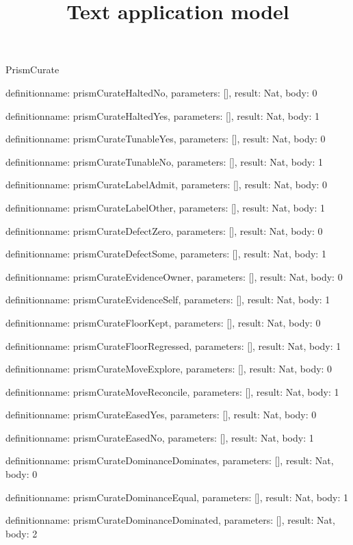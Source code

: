 \begin{lexlean}{PrismCurate}
\title{Text application model}
\begin{semanticmodule}
definition{name: prismCurateHaltedNo, parameters: [], result: Nat, body: 0}

definition{name: prismCurateHaltedYes, parameters: [], result: Nat, body: 1}

definition{name: prismCurateTunableYes, parameters: [], result: Nat, body: 0}

definition{name: prismCurateTunableNo, parameters: [], result: Nat, body: 1}

definition{name: prismCurateLabelAdmit, parameters: [], result: Nat, body: 0}

definition{name: prismCurateLabelOther, parameters: [], result: Nat, body: 1}

definition{name: prismCurateDefectZero, parameters: [], result: Nat, body: 0}

definition{name: prismCurateDefectSome, parameters: [], result: Nat, body: 1}

definition{name: prismCurateEvidenceOwner, parameters: [], result: Nat, body: 0}

definition{name: prismCurateEvidenceSelf, parameters: [], result: Nat, body: 1}

definition{name: prismCurateFloorKept, parameters: [], result: Nat, body: 0}

definition{name: prismCurateFloorRegressed, parameters: [], result: Nat, body: 1}

definition{name: prismCurateMoveExplore, parameters: [], result: Nat, body: 0}

definition{name: prismCurateMoveReconcile, parameters: [], result: Nat, body: 1}

definition{name: prismCurateEasedYes, parameters: [], result: Nat, body: 0}

definition{name: prismCurateEasedNo, parameters: [], result: Nat, body: 1}

definition{name: prismCurateDominanceDominates, parameters: [], result: Nat, body: 0}

definition{name: prismCurateDominanceEqual, parameters: [], result: Nat, body: 1}

definition{name: prismCurateDominanceDominated, parameters: [], result: Nat, body: 2}


\end{semanticmodule}
\end{lexlean}
